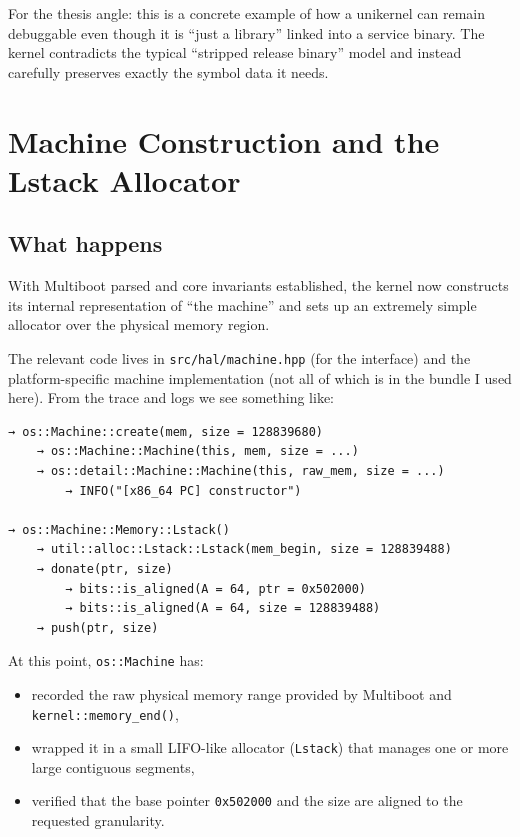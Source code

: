 \documentclass[a4paper,11pt]{article}
\begin{document}
For the thesis angle: this is a concrete example of how a unikernel can
remain debuggable even though it is “just a library” linked into a
service binary. The kernel contradicts the typical “stripped release
binary” model and instead carefully preserves exactly the symbol data it
needs.

\section{Machine Construction and the Lstack Allocator}

\subsection{What happens}

With Multiboot parsed and core invariants established, the kernel now
constructs its internal representation of “the machine” and sets up an
extremely simple allocator over the physical memory region.

The relevant code lives in \texttt{src/hal/machine.hpp} (for the
interface) and the platform-specific machine implementation (not all of
which is in the bundle I used here). From the trace and logs we see
something like:

\begin{verbatim}
→ os::Machine::create(mem, size = 128839680)
    → os::Machine::Machine(this, mem, size = ...)
    → os::detail::Machine::Machine(this, raw_mem, size = ...)
        → INFO("[x86_64 PC] constructor")

→ os::Machine::Memory::Lstack()
    → util::alloc::Lstack::Lstack(mem_begin, size = 128839488)
    → donate(ptr, size)
        → bits::is_aligned(A = 64, ptr = 0x502000)
        → bits::is_aligned(A = 64, size = 128839488)
    → push(ptr, size)
\end{verbatim}

At this point, \texttt{os::Machine} has:

\begin{itemize}
  \item recorded the raw physical memory range provided by Multiboot and
        \texttt{kernel::memory\_end()},
  \item wrapped it in a small LIFO-like allocator (\texttt{Lstack}) that
        manages one or more large contiguous segments,
  \item verified that the base pointer \texttt{0x502000} and the size are
        aligned to the requested granularity.
\end{itemize}
\end{document}
